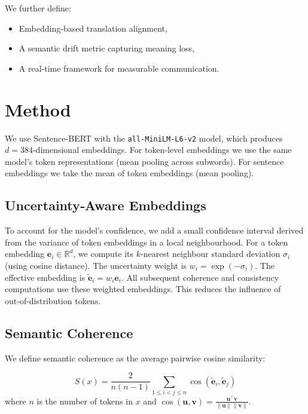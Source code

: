 \documentclass[11pt]{article}
\theoremstyle{definition}
\begin{document}
We further define:
\begin{itemize}[noitemsep]
    \item Embedding‑based translation alignment,
    \item A semantic drift metric capturing meaning loss,
    \item A real‑time framework for measurable communication.
\end{itemize}

\section{Method}

We use Sentence‑BERT \cite{reimers2019sentence} with the \texttt{all-MiniLM-L6-v2} model, which produces $d=384$-dimensional embeddings. For token‑level embeddings we use the same model's token representations (mean pooling across subwords). For sentence embeddings we take the mean of token embeddings (mean pooling).

\subsection{Uncertainty‑Aware Embeddings}
To account for the model's confidence, we add a small confidence interval derived from the variance of token embeddings in a local neighbourhood. For a token embedding $\mathbf{e}_i \in \mathbb{R}^d$, we compute its $k$-nearest neighbour standard deviation $\sigma_i$ (using cosine distance). The uncertainty weight is $w_i = \exp(-\sigma_i)$. The effective embedding is $\tilde{\mathbf{e}}_i = w_i \mathbf{e}_i$. All subsequent coherence and consistency computations use these weighted embeddings. This reduces the influence of out‑of‑distribution tokens.

\subsection{Semantic Coherence}
We define semantic coherence as the average pairwise cosine similarity:

\begin{equation}
S(x) = \frac{2}{n(n-1)} \sum_{1 \le i < j \le n} \cos(\tilde{\mathbf{e}}_i, \tilde{\mathbf{e}}_j)
\end{equation}
where $n$ is the number of tokens in $x$ and $\cos(\mathbf{u},\mathbf{v}) = \frac{\mathbf{u}^\top \mathbf{v}}{\|\mathbf{u}\|\|\mathbf{v}\|}$.
\end{document}
